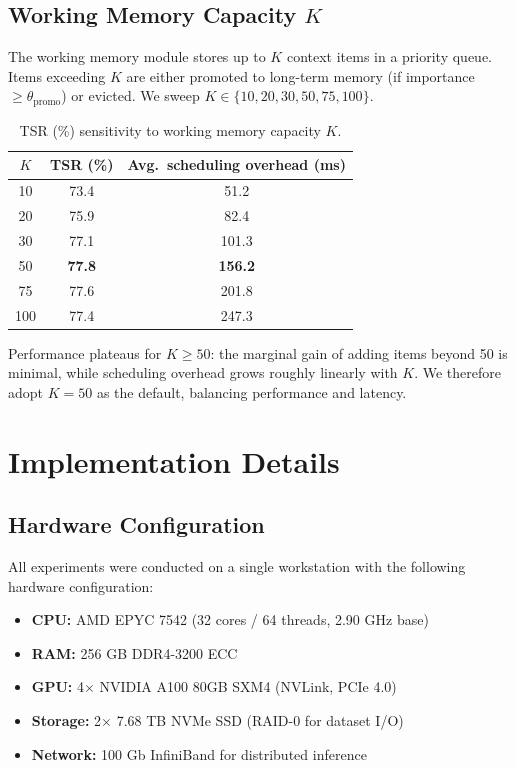 \subsection{Working Memory Capacity $K$}

The working memory module stores up to $K$ context items in a priority queue.
Items exceeding $K$ are either promoted to long-term memory (if importance
$\geq \theta_{\text{promo}}$) or evicted.  We sweep $K \in \{10, 20, 30, 50, 75, 100\}$.

\begin{table}[h!]
\centering
\caption{TSR (\%) sensitivity to working memory capacity $K$.}
\label{tab:app_wm_capacity}
\begin{tabular}{@{}ccc@{}}
\toprule
$K$ & \textbf{TSR (\%)} & \textbf{Avg.\ scheduling overhead (ms)} \\
\midrule
10  & 73.4 &  51.2 \\
20  & 75.9 &  82.4 \\
30  & 77.1 &  101.3 \\
50  & \textbf{77.8} &  \textbf{156.2} \\
75  & 77.6 &  201.8 \\
100 & 77.4 &  247.3 \\
\bottomrule
\end{tabular}
\end{table}

\noindent Performance plateaus for $K \geq 50$: the marginal gain of adding
items beyond 50 is minimal, while scheduling overhead grows roughly linearly
with $K$.  We therefore adopt $K = 50$ as the default, balancing performance
and latency.


\section{Implementation Details}
\label{app:implementation}

\subsection{Hardware Configuration}

All experiments were conducted on a single workstation with the following
hardware configuration:

\begin{itemize}
  \item \textbf{CPU:} AMD EPYC 7542 (32 cores / 64 threads, 2.90 GHz base)
  \item \textbf{RAM:} 256 GB DDR4-3200 ECC
  \item \textbf{GPU:} 4$\times$ NVIDIA A100 80GB SXM4 (NVLink, PCIe 4.0)
  \item \textbf{Storage:} 2$\times$ 7.68 TB NVMe SSD (RAID-0 for dataset I/O)
  \item \textbf{Network:} 100 Gb InfiniBand for distributed inference
\end{itemize}

